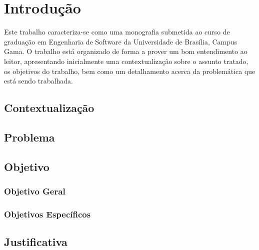 \chapter{Introdução}

Este trabalho caracteriza-se como uma monografia submetida ao curso de graduação em Engenharia de Software da Universidade de Brasília, Campus Gama. O trabalho está organizado de forma a prover um bom entendimento ao leitor, apresentando inicialmente uma contextualização sobre o assunto tratado, os objetivos do trabalho, bem como um detalhamento acerca da problemática que está sendo trabalhada.

\section{Contextualização}

\section{Problema}

\section{Objetivo}

\subsection{Objetivo Geral}

\subsection{Objetivos Específicos}

\section{Justificativa}